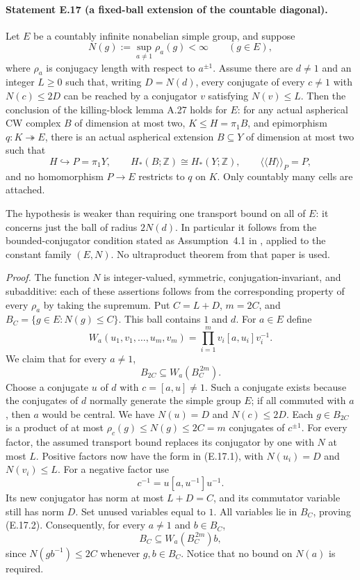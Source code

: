 \paragraph{Statement E.17 (a fixed-ball extension of the countable diagonal).}
Let $E$ be a countably infinite nonabelian simple group, and suppose
\[
 N(g):=\sup_{a\ne1}\rho_a(g)<\infty\qquad(g\in E),
\]
where $\rho_a$ is conjugacy length with respect to $a^{\pm1}$.
Assume there are $d\ne1$ and an integer $L\geq0$ such that, writing
$D=N(d)$, every conjugate of every $c\ne1$ with $N(c)\leq2D$
can be reached by a conjugator $v$ satisfying $N(v)\leq L$.
Then the conclusion of the killing-block lemma A.27 holds for $E$:
for any actual aspherical CW complex $B$ of dimension at most two,
$K\leq H=\pi_1B$, and epimorphism $q:K\twoheadrightarrow E$, there
is an actual aspherical extension $B\subseteq Y$ of dimension at
most two such that
\[
 H\hookrightarrow P=\pi_1Y,\qquad
 H_*(B;\mathbb Z)\cong H_*(Y;\mathbb Z),\qquad
 \langle\!\langle H\rangle\!\rangle_P=P,
\]
and no homomorphism $P\to E$ restricts to $q$ on $K$.
Only countably many cells are attached.

The hypothesis is weaker than requiring one transport bound on
all of $E$: it concerns just the ball of radius $2N(d)$.
In particular it follows from the bounded-conjugator condition
stated as Assumption~4.1 in
\cite{EGismatullinMajcherZiegler2024}, applied to the constant
family $(E,N)$. No ultraproduct theorem from that paper is used.

\emph{Proof.}
The function $N$ is integer-valued, symmetric, conjugation-invariant,
and subadditive: each of these assertions follows from the
corresponding property of every $\rho_a$ by taking the supremum.
Put $C=L+D$, $m=2C$, and
$B_C=\{g\in E:N(g)\leq C\}$. This ball contains $1$ and $d$.
For $a\in E$ define
\[
 W_a(u_1,v_1,\ldots,u_m,v_m)
       =\prod_{i=1}^{m}v_i[a,u_i]v_i^{-1}.
 \tag{E.17.1}
\]
We claim that for every $a\ne1$,
\[
             B_{2C}\subseteq W_a(B_C^{\,2m}).
 \tag{E.17.2}
\]
Choose a conjugate $u$ of $d$ with $c=[a,u]\ne1$.
Such a conjugate exists because the conjugates of $d$ normally
generate the simple group $E$; if all commuted with $a$, then
$a$ would be central. We have $N(u)=D$ and
$N(c)\leq2D$. Each $g\in B_{2C}$ is a product of at most
$\rho_c(g)\leq N(g)\leq2C=m$ conjugates of $c^{\pm1}$.
For every factor, the assumed transport bound replaces its
conjugator by one with $N$ at most $L$. Positive factors now
have the form in (E.17.1), with $N(u_i)=D$ and $N(v_i)\leq L$.
For a negative factor use
\[
                  c^{-1}=u[a,u^{-1}]u^{-1}.
\]
Its new conjugator has norm at most $L+D=C$, and its commutator
variable still has norm $D$. Set unused variables equal to $1$.
All variables lie in $B_C$, proving (E.17.2). Consequently,
for every $a\ne1$ and $b\in B_C$,
\[
                  B_C\subseteq W_a(B_C^{\,2m})b,
 \tag{E.17.3}
\]
since $N(gb^{-1})\leq2C$ whenever $g,b\in B_C$.
Notice that no bound on $N(a)$ is required.

